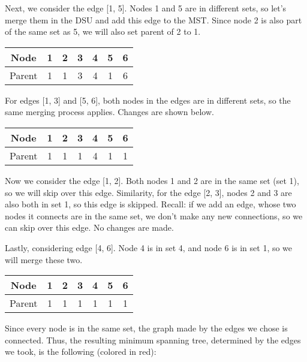 \documentclass{article}
\begin{document}
Next, we consider the edge [1, 5]. Nodes 1 and 5 are in different sets, so let's merge them in the DSU and add this edge to the MST. Since node 2 is also part of the same set as 5, we will also set parent of 2 to 1.

\begin{center}
\begin{tabular}{|c|c|c|c|c|c|c|}
\hline
Node & 1 & \cellcolor[gray]{0.75}2 & 3 & 4 & \cellcolor[gray]{0.75}5 & 6\\
\hline
Parent & 1 & \cellcolor[gray]{0.75}1 & 3 & 4 & \cellcolor[gray]{0.75}1 & 6 \\
\hline
\end{tabular}
\end{center}

For edges [1, 3] and [5, 6], both nodes in the edges are in different sets, so the same merging process applies. Changes are shown below.

\begin{center}
\begin{tabular}{|c|c|c|c|c|c|c|}
\hline
Node & 1 & 2 & \cellcolor[gray]{0.75}3 & 4 & 5 & \cellcolor[gray]{0.75}6\\
\hline
Parent & 1 & 1 &\cellcolor[gray]{0.75}1 & 4 & 1 & \cellcolor[gray]{0.75}1 \\
\hline
\end{tabular}
\end{center}

Now we consider the edge [1, 2]. Both nodes 1 and 2 are in the same set (set 1), so we will skip over this edge. Similarity, for the edge [2, 3], nodes 2 and 3 are also both in set 1, so this edge is skipped. Recall: if we add an edge, whose two nodes it connects are in the same set, we don't make any new connections, so we can skip over this edge. No changes are made.

Lastly, considering edge [4, 6]. Node 4 is in set 4, and node 6 is in set 1, so we will merge these two.

\begin{center}
\begin{tabular}{|c|c|c|c|c|c|c|}
\hline
Node & 1 & 2 & 3 & \cellcolor[gray]{0.75}4 & 5 & 6\\
\hline
Parent & 1 & 1 & 1 & \cellcolor[gray]{0.75}1 & 1 & 1 \\
\hline
\end{tabular}
\end{center}
 
Since every node is in the same set, the graph made by the edges we chose is connected. Thus, the resulting minimum spanning tree, determined by the edges we took, is the following (colored in red):
\end{document}
